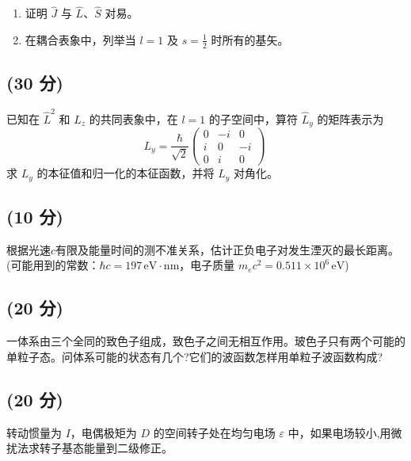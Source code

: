 \begin{enumerate}
    \item 证明 $\hat{J}$ 与 $\hat{L}$、$\hat{S}$ 对易。
    
    \item 在耦合表象中，列举当 $l=1$ 及 $s=\frac{1}{2}$ 时所有的基矢。
\end{enumerate}
\subsection{(30 分)}
已知在 $\hat{L}^2$ 和 $\hat{L}_z$ 的共同表象中，在 $l=1$ 的子空间中，算符 $\hat{L}_y$ 的矩阵表示为
\[
L_y = \frac{\hbar}{\sqrt{2}}
\begin{pmatrix}
0 & -i & 0 \\
i & 0 & -i \\
0 & i & 0 
\end{pmatrix}~
\]
求 $L_y$ 的本征值和归一化的本征函数，并将 $L_y$ 对角化。
\subsection{(10 分)}
根据光速$c$有限及能量时间的测不准关系，估计正负电子对发生湮灭的最长距离。(可能用到的常数：$\hbar c = 197 \, \text{eV} \cdot \text{nm}$，电子质量 $m_e c^2 = 0.511 \times 10^6 \, \text{eV}$)
\subsection{(20 分)}
一体系由三个全同的致色子组成，致色子之间无相互作用。玻色子只有两个可能的单粒子态。问体系可能的状态有几个?它们的波函数怎样用单粒子波函数构成?
\subsection{(20 分)}
转动惯量为 $I$，电偶极矩为 $D$ 的空间转子处在均匀电场 $\varepsilon$ 中，如果电场较小,用微扰法求转子基态能量到二级修正。
